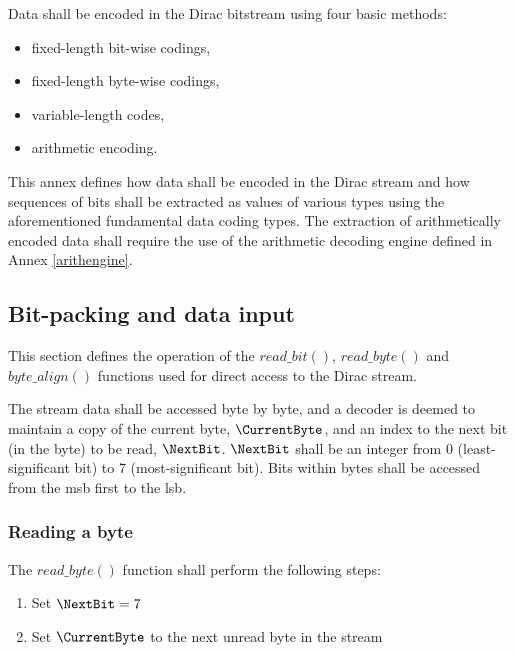 
\label{dataenc}

Data shall be encoded in the Dirac bitstream using four basic methods: 
\begin{itemize}
\item fixed-length bit-wise codings,
\item fixed-length byte-wise codings,
\item variable-length codes,
\item arithmetic encoding.
\end{itemize}

This annex defines how data shall be encoded in the Dirac stream and how 
sequences of bits shall be extracted as values of various types using the 
aforementioned fundamental data coding types. The extraction of arithmetically
encoded data shall require the use of the arithmetic decoding engine defined in 
Annex \ref{arithengine}.

\subsection{Bit-packing and data input}
\label{bitpacking}

This section defines the operation of the $read\_bit()$, $read\_byte()$ 
and $byte\_align()$ functions used for direct access to the Dirac stream.

The stream data shall be accessed byte by byte, and a decoder is deemed to 
maintain a copy of the current byte, $\CurrentByte$, and an index to the next 
bit (in the byte) to be read, $\NextBit$. $\NextBit$ shall be an integer from 0
 (least-significant bit) to 7 (most-significant bit). Bits within bytes shall be
 accessed from the msb first to the lsb.

\subsubsection{Reading a byte}

The $read\_byte()$ function shall perform the following steps:
\begin{enumerate}
\item Set $\NextBit=7$ 
\item Set $\CurrentByte$ to the next unread byte in the stream
\end{enumerate}

